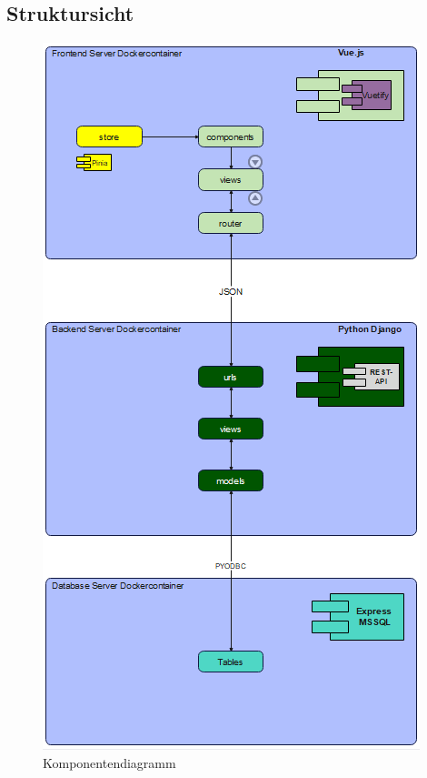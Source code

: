 \documentclass{article}
\begin{document}
\subsection{ Struktursicht}
\begin{figure}[h]
    \centering
    \includegraphics[scale=0.85]{images/Struktursicht.png}
    \caption{Komponentendiagramm}
    \label{fig:beispiel}
\end{figure}
\newpage
\end{document}
